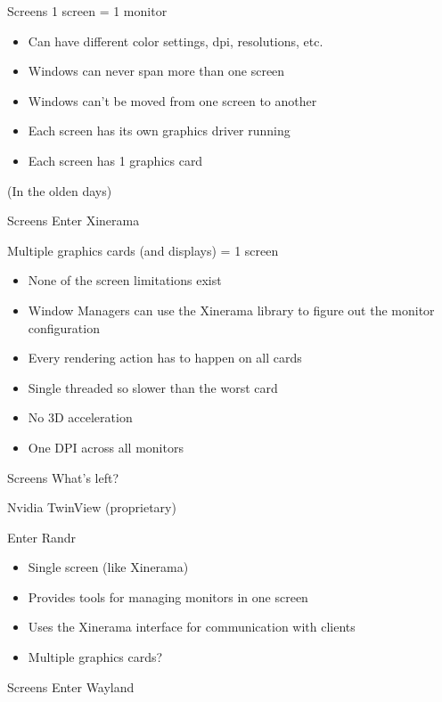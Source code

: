 \documentclass[10pt]{beamer}
\begin{document}
\begin{frame}[fragile]{Screens}
  1 screen = 1 monitor
  \begin{itemize}[<+->]
    \item Can have different color settings, dpi, resolutions, etc.
    \item Windows can never span more than one screen
    \item Windows can't be moved from one screen to another
    \item Each screen has its own graphics driver running
    \item Each screen has 1 graphics card
  \end{itemize}
  \onslide<+->
  (In the olden days)
\end{frame}
\begin{frame}[fragile]{Screens}
  Enter Xinerama
  \pause

  Multiple graphics cards (and displays) = 1 screen
  \begin{itemize}[<+->]
    \item None of the screen limitations exist
    \item Window Managers can use the Xinerama library to figure out the monitor
      configuration
    \item Every rendering action has to happen on all cards
    \item Single threaded so slower than the worst card
    \item No 3D acceleration
    \item One DPI across all monitors
  \end{itemize}
\end{frame}
\begin{frame}[fragile]{Screens}
  What's left?
  \pause

  Nvidia TwinView
  \pause
  (proprietary)
  \pause

  Enter Randr
  \onslide<+->

  \begin{itemize}[<+->]
    \item Single screen (like Xinerama)
    \item Provides tools for managing monitors in one screen
    \item Uses the Xinerama interface for communication with clients
    \item Multiple graphics cards?
  \end{itemize}
\end{frame}
\begin{frame}[fragile]{Screens}
Enter Wayland
\end{frame}
\end{document}
